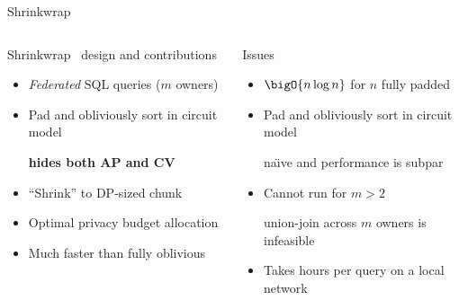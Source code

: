 		\begin{frame}{Shrinkwrap~\cite{shrinkwrap}}

			\begin{columns}[T,onlytextwidth]

					\begin{block}{Shrinkwrap~\cite{shrinkwrap} design and contributions}

						\begin{itemize}
							\item \emph{Federated} SQL queries ($m$ owners)
							\item Pad and obliviously sort in circuit model \\
							\begin{small}
								\textbf{hides both AP and CV}
							\end{small}
							\item ``Shrink'' to DP-sized chunk
							\item Optimal privacy budget allocation
							\item Much faster than fully oblivious
						\end{itemize}

					\end{block}


					\begin{block}{Issues}

						\begin{itemize}
							\item $\bigO{n \log n}$ for $n$ fully padded
							\item Pad and obliviously sort in circuit model \\
								\begin{small}
									na\"\i{}ve and performance is subpar
								\end{small}
							\item Cannot run for $m > 2$ \\
								\begin{small}
									union-join across $m$ owners is infeasible
								\end{small}
							\item Takes hours per query on a local network
						\end{itemize}

					\end{block}

			\end{columns}

		\end{frame}

